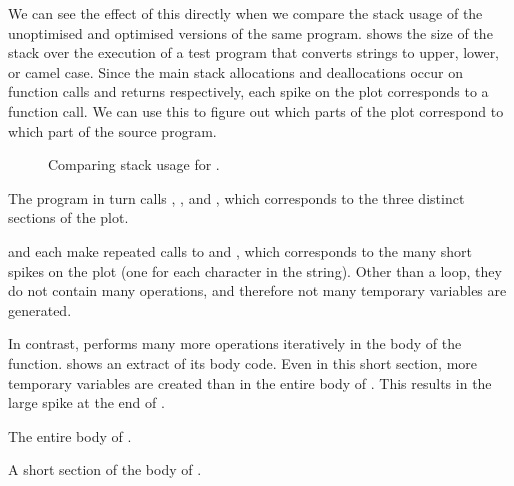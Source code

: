 \documentclass[00-main.tex]{subfiles}
\begin{document}
We can see the effect of this directly when we compare the stack usage of the unoptimised and optimised versions of the same program.
 shows the size of the stack over the execution of a test program that converts strings to upper, lower, or camel case.
Since the main stack allocations and deallocations occur on function calls and returns respectively, each spike on the plot corresponds to a function call. We can use this to figure out which parts of the plot correspond to which part of the source program.

\begin{figure}[ht]
  \centering
  \caption{Comparing stack usage for .}
  \label{fig:comparing stack usage for case.c}
\end{figure}

The program in turn calls , , and , which corresponds to the three distinct sections of the plot.

 and  each make repeated calls to  and , which corresponds to the many short spikes on the plot (one for each character in the string).
Other than a  loop, they do not contain many operations, and therefore not many temporary variables are generated.


In contrast,  performs many more operations iteratively in the body of the function.
 shows an extract of its body code.
Even in this short section, more temporary variables are created than in the entire body of .
This results in the large spike at the end of .

\begin{listing}[!ht]
  \caption{The entire body of .}
  \label{lst:caseupper body code}
\end{listing}

\begin{listing}[!ht]
  \caption{A short section of the body of .}
  \label{lst:section of casecamel body code}
\end{listing}
\end{document}
